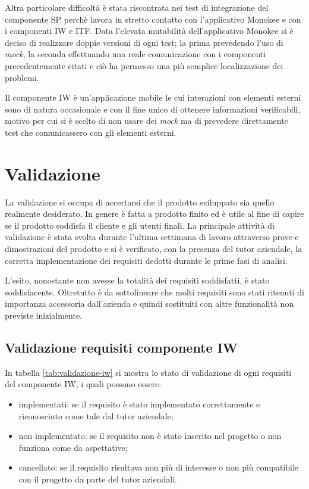 Altra particolare difficoltà è stata riscontrata nei test di integrazione del componente SP perchè lavora in stretto contatto con l'applicativo Monokee e con i componenti IW e ITF. Data l'elevata mutabilità dell'applicativo Monokee si è deciso di realizzare doppie versioni di ogni test; la prima prevedendo l'uso di \emph{mock}, la seconda  effettuando una reale comunicazione con i componenti precedentemente citati e ciò ha permesso una più semplice localizzazione dei problemi.

Il componente IW è un'applicazione mobile le cui interazioni con elementi esterni sono di natura occasionale e con il fine unico di ottenere informazioni verificabili, motivo per cui si è scelto di non usare dei \emph{mock} ma di prevedere direttamente test che comunicassero con gli elementi esterni.


\section{Validazione}
La validazione si occupa di accertarsi che il prodotto sviluppato sia quello realmente desiderato. In genere è fatta a prodotto finito ed è utile al fine di capire se il prodotto soddisfa il cliente e gli utenti finali. La principale attività di validazione è stata svolta durante l'ultima settimana di lavoro attraverso prove e dimostrazioni del prodotto e si è verificato, con la presenza del tutor aziendale, la corretta implementazione dei requisiti dedotti durante le prime fasi di analisi.

L'esito, nonostante non avesse la totalità dei requisiti soddisfatti, è stato soddisfacente. Oltretutto è da sottolineare che molti requisiti sono stati ritenuti di importanza accessoria dall'azienda e quindi sostituiti con altre funzionalità non previste inizialmente.


\subsection{Validazione requisiti componente IW}
In tabella \ref{tab:validazione-iw} si mostra lo stato di validazione di ogni requisiti del componente IW, i quali possono essere:
\begin{itemize}
    \item implementati: se il requisito è stato implementato correttamente e riconosciuto come tale dal tutor aziendale;
    \item non implementato: se il requisito non è stato inserito nel progetto o non funziona come da aspettative;
    \item cancellato: se il requisito risultava non più di interesse o non più compatibile con il progetto da parte del tutor aziendali.
\end{itemize}

